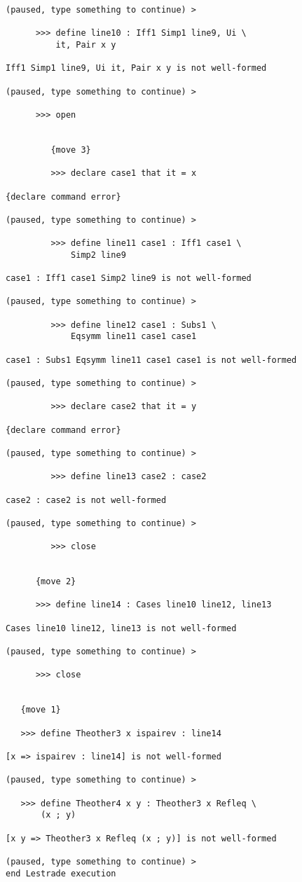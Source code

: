 \documentclass[12pt]{article}
\begin{document}
\begin{verbatim}
(paused, type something to continue) >

      >>> define line10 : Iff1 Simp1 line9, Ui \
          it, Pair x y

Iff1 Simp1 line9, Ui it, Pair x y is not well-formed

(paused, type something to continue) >

      >>> open


         {move 3}

         >>> declare case1 that it = x

{declare command error}

(paused, type something to continue) >

         >>> define line11 case1 : Iff1 case1 \
             Simp2 line9

case1 : Iff1 case1 Simp2 line9 is not well-formed

(paused, type something to continue) >

         >>> define line12 case1 : Subs1 \
             Eqsymm line11 case1 case1

case1 : Subs1 Eqsymm line11 case1 case1 is not well-formed

(paused, type something to continue) >

         >>> declare case2 that it = y

{declare command error}

(paused, type something to continue) >

         >>> define line13 case2 : case2

case2 : case2 is not well-formed

(paused, type something to continue) >

         >>> close


      {move 2}

      >>> define line14 : Cases line10 line12, line13

Cases line10 line12, line13 is not well-formed

(paused, type something to continue) >

      >>> close


   {move 1}

   >>> define Theother3 x ispairev : line14

[x => ispairev : line14] is not well-formed

(paused, type something to continue) >

   >>> define Theother4 x y : Theother3 x Refleq \
       (x ; y)

[x y => Theother3 x Refleq (x ; y)] is not well-formed

(paused, type something to continue) >
end Lestrade execution
\end{verbatim}
\end{document}
